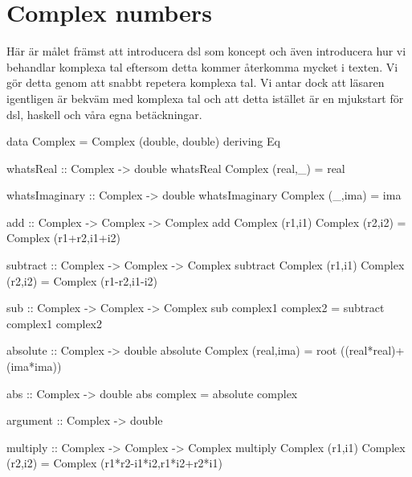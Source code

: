 
\section{Complex numbers}
Här är målet främst att introducera dsl som koncept och även introducera hur vi behandlar komplexa tal eftersom detta kommer återkomma mycket i texten. Vi gör detta genom att snabbt repetera komplexa tal. Vi antar dock att läsaren igentligen är bekväm med komplexa tal och att detta istället är en mjukstart för dsl, haskell och våra egna betäckningar.\\




\begin{code}
data Complex = Complex (double, double)
  deriving Eq
  
whatsReal :: Complex -> double
whatsReal Complex (real,_) = real

whatsImaginary :: Complex -> double
whatsImaginary Complex (_,ima) = ima

  
add :: Complex -> Complex -> Complex
add Complex (r1,i1) Complex (r2,i2) = Complex (r1+r2,i1+i2)

subtract :: Complex -> Complex -> Complex
subtract Complex (r1,i1) Complex (r2,i2) = Complex (r1-r2,i1-i2)

sub :: Complex -> Complex -> Complex
sub complex1 complex2 = subtract complex1 complex2

absolute :: Complex -> double
absolute Complex (real,ima) = root ((real*real)+(ima*ima))

abs :: Complex -> double
abs complex = absolute complex

argument :: Complex -> double


multiply :: Complex -> Complex -> Complex
multiply Complex (r1,i1) Complex (r2,i2)
  = Complex (r1*r2-i1*i2,r1*i2+r2*i1)

\end{code}

